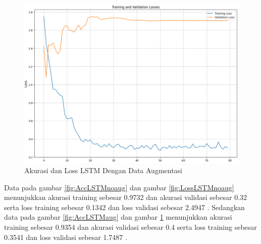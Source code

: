 \begin{figure} [ht] \centering
  \includegraphics[scale=0.55]{gambar/LossLSTMaug.png}
  \caption{Akurasi dan Loss LSTM Dengan Data Augmentasi}
  \label{fig:LossLSTMaug}
\end{figure}

Data pada gambar \ref{fig:AccLSTMnoaug} dan gambar \ref{fig:LossLSTMnoaug} menunjukkan akurasi training sebesar 0.9732
dan akurasi validasi sebesar 0.32 serta loss training sebesar 0.1342 dan loss validasi
sebesar 2.4947 . Sedangkan data pada gambar \ref{fig:AccLSTMaug} dan gambar \ref{fig:LossLSTMaug}
menunjukkan akurasi training sebesar 0.9354 dan akurasi validasi sebesar 0.4
serta loss training sebesar 0.3541 dan loss validasi sebesar 1.7487 .

\newpage
